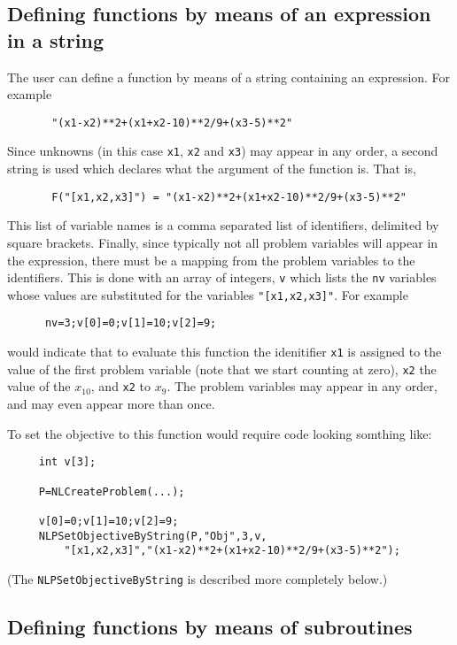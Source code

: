 \documentclass[12pt]{article}
\begin{document}
    \subsection{Defining functions by means of an expression in a string}

     The user can define a function by means of a string containing an expression. For example
     \begin{verbatim}
       "(x1-x2)**2+(x1+x2-10)**2/9+(x3-5)**2"
     \end{verbatim}
     Since unknowns (in this case {\tt x1}, {\tt x2} and {\tt x3}) may appear in any order, a second string is
     used which declares what the argument of the function is. That is,
     \begin{verbatim}
       F("[x1,x2,x3]") = "(x1-x2)**2+(x1+x2-10)**2/9+(x3-5)**2"
     \end{verbatim}
     This list of variable names is a comma separated list of identifiers, delimited by square brackets.
     Finally, since typically not all problem variables will appear in the expression, there must be a mapping 
     from the problem variables to the identifiers. This is done with an array of integers,
     {\tt v} which lists the {\tt nv} variables whose values are substituted for the variables
     {\tt "[x1,x2,x3]"}. For example
     \begin{verbatim}
      nv=3;v[0]=0;v[1]=10;v[2]=9;
     \end{verbatim}
     would indicate that to evaluate this function the idenitifier {\tt x1} is assigned to the value of the
     first problem variable (note that we start counting at zero), {\tt x2} the value of the $x_{10}$,
     and {\tt x2} to $x_9$. The problem variables may appear in any order, and may even appear more than once.

     To set the objective to this function would require code looking somthing like:
    \begin{verbatim}
     int v[3];

     P=NLCreateProblem(...);

     v[0]=0;v[1]=10;v[2]=9;
     NLPSetObjectiveByString(P,"Obj",3,v,
         "[x1,x2,x3]","(x1-x2)**2+(x1+x2-10)**2/9+(x3-5)**2");
    \end{verbatim}
     (The {\tt NLP\-Set\-Objective\-ByString} is described more completely below.)

    \subsection{Defining functions by means of subroutines}
\end{document}

